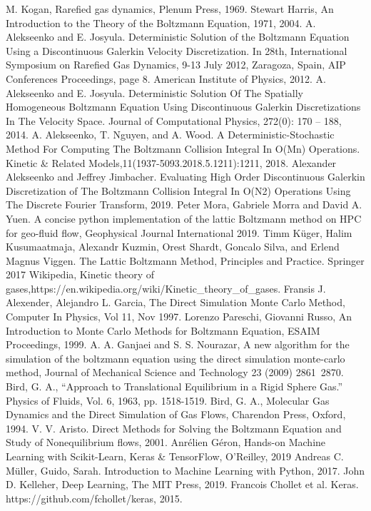 \documentclass{article}
\begin{document}
\pagebreak
\begin{thebibliography}{99}
	M. Kogan, Rarefied gas dynamics, Plenum Press, 1969.
	Stewart Harris, An Introduction to the Theory of the Boltzmann Equation, 1971, 2004.
	A. Alekseenko and E. Josyula.  Deterministic Solution of the Boltzmann Equation Using a Discontinuous Galerkin Velocity Discretization. In 28th, International Symposium on Rarefied Gas Dynamics, 9-13 July 2012, Zaragoza, Spain, AIP Conferences Proceedings, page 8. American Institute of Physics, 2012.
	A. Alekseenko and E. Josyula.  Deterministic Solution Of The Spatially Homogeneous Boltzmann Equation Using Discontinuous Galerkin Discretizations In The Velocity Space. Journal of Computational Physics, 272(0): 170 – 188, 2014.
	A. Alekseenko, T. Nguyen, and A. Wood. A Deterministic-Stochastic Method For Computing The Boltzmann Collision Integral In O(Mn) Operations. Kinetic \& Related Models,11(1937-5093.2018.5.1211):1211, 2018.
	Alexander Alekseenko and Jeffrey Jimbacher. Evaluating High Order Discontinuous Galerkin Discretization of The Boltzmann Collision Integral In O(N2) Operations Using The Discrete Fourier Transform, 2019.
	 Peter Mora, Gabriele Morra and David A. Yuen. A concise python implementation of the lattic Boltzmann method on HPC for geo-fluid flow, Geophysical Journal International 2019.
	 Timm K\"{u}ger, Halim Kusumaatmaja, Alexandr Kuzmin, Orest Shardt, Goncalo Silva, and Erlend Magnus Viggen. The Lattic Boltzmann Method, Principles and Practice. Springer 2017
	Wikipedia, Kinetic theory of gases,https://en.wikipedia.org/wiki/Kinetic\_theory\_of\_gases.
	Fransis J. Alexender, Alejandro L. Garcia, The Direct Simulation Monte Carlo Method, Computer In Physics, Vol 11, Nov 1997.
	Lorenzo Pareschi, Giovanni Russo, An Introduction to Monte Carlo Methods for Boltzmann Equation, ESAIM Proceedings, 1999.
	A. A. Ganjaei and S. S. Nourazar, A new algorithm for the simulation of the boltzmann equation using the direct simulation monte-carlo method, Journal of Mechanical Science and Technology 23 (2009) 2861~2870.
	Bird, G. A., “Approach to Translational Equilibrium in a Rigid Sphere Gas.” Physics of Fluids, Vol. 6, 1963, pp. 1518-1519.
	Bird, G. A., Molecular Gas Dynamics and the Direct Simulation of Gas Flows, Charendon Press, Oxford, 1994.
	 V. V. Aristo. Direct Methods for Solving the Boltzmann Equation and Study of Nonequilibrium flows, 2001.
	Anr\'{e}lien G\'{e}ron, Hands-on Machine Learning with Scikit-Learn, Keras \& TensorFlow, O'Reilley, 2019
	Andreas C. Müller, Guido, Sarah. Introduction to Machine Learning with Python, 2017.
	John D. Kelleher, Deep Learning, The MIT Press, 2019.
	Francois Chollet et al. Keras. https://github.com/fchollet/keras, 2015.
\end{thebibliography}
\end{document}
